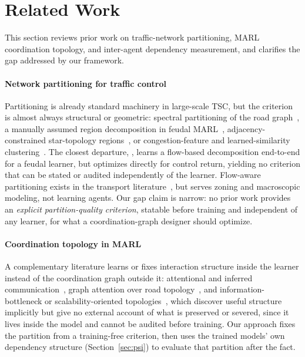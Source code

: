 \documentclass[journal]{IEEEtran}
\theoremstyle{definition}
\begin{document}
\section{Related Work}
\label{sec:related}

This section reviews prior work on traffic-network partitioning, MARL coordination topology, and inter-agent dependency measurement, and clarifies the gap addressed by our framework.

\paragraph{Network partitioning for traffic control}
Partitioning is already standard machinery in large-scale TSC, but the criterion is almost always structural or geometric: spectral partitioning of the road graph~\citep{laplacian2009ieee}, a manually assumed region decomposition in feudal MARL~\citep{ma2020fma2c}, adjacency-constrained star-topology regions~\citep{regionlight2024}, or congestion-feature and learned-similarity clustering~\citep{communitydetection2021plosone,liu2023gplight}. The closest departure, \citet{ma2022feudal}, learns a flow-based decomposition end-to-end for a feudal learner, but optimizes directly for control return, yielding no criterion that can be stated or audited independently of the learner. Flow-aware partitioning exists in the transport literature~\citep{odflow2019partition,mfdpartition2020}, but serves zoning and macroscopic modeling, not learning agents. Our gap claim is narrow: no prior work provides an \emph{explicit partition-quality criterion}, statable before training and independent of any learner, for what a coordination-graph designer should optimize.

\paragraph{Coordination topology in MARL}
A complementary literature learns or fixes interaction structure inside the learner instead of the coordination graph outside it: attentional and inferred communication~\citep{jiang2018atoc,i2c2021,peng2020structured,aamas2021correlated}, graph attention over road topology~\citep{wei2019colight}, and information-bottleneck or scalability-oriented topologies~\citep{hetib2025,sun2026ibvq,wang2020imac,expocomm2025,li2025topology,zhu2026halo}, which discover useful structure implicitly but give no external account of what is preserved or severed, since it lives inside the model and cannot be audited before training. Our approach fixes the partition from a training-free criterion, then uses the trained models' own dependency structure (Section~\ref{sec:psi}) to evaluate that partition after the fact.
\end{document}

